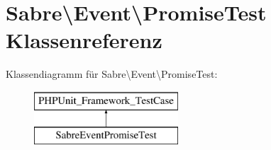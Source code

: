 \hypertarget{class_sabre_1_1_event_1_1_promise_test}{}\section{Sabre\textbackslash{}Event\textbackslash{}Promise\+Test Klassenreferenz}
\label{class_sabre_1_1_event_1_1_promise_test}
Klassendiagramm für Sabre\textbackslash{}Event\textbackslash{}Promise\+Test\+:\begin{figure}[H]
\begin{center}
\leavevmode
\includegraphics[height=2.000000cm]{class_sabre_1_1_event_1_1_promise_test}
\end{center}
\end{figure}
